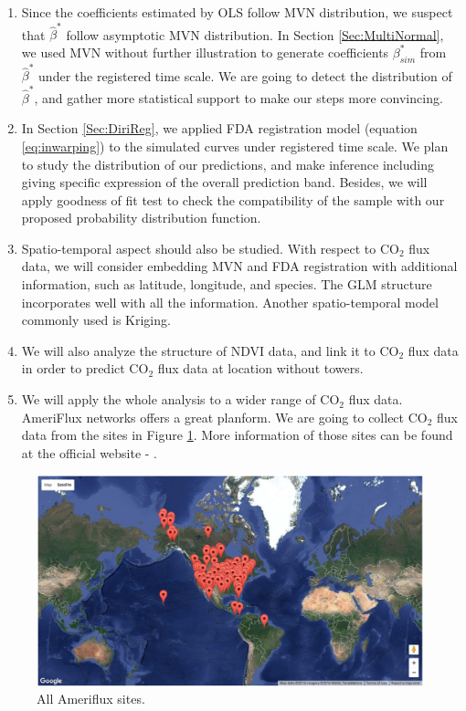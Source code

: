 \documentclass{article}
\newcommand{\MYhref}[3][blue]{\href{#2}{\color{#1}{#3}}}%
\begin{document}
\begin{enumerate}
\item Since the coefficients estimated by OLS follow MVN distribution, we suspect that $\widehat{\beta}^{*}$ follow asymptotic MVN distribution. In Section \ref{Sec:MultiNormal}, we used MVN without further illustration to generate coefficients $\beta^{*}_{sim}$  from $\widehat{\beta}^{*}$ under the registered time scale. We are going to detect the distribution of $\widehat{\beta}^{*}$, and gather more statistical support to make our steps more convincing. 
\item In Section \ref{Sec:DiriReg}, we applied FDA registration model (equation \ref{eq:inwarping}) to the simulated curves under registered time scale. We plan to study the distribution of our predictions, and make inference including giving specific expression of the overall prediction band. Besides, we will apply goodness of fit test to check the compatibility of the sample with our proposed probability distribution function.
\item Spatio-temporal aspect should also be studied. With respect to CO$_2$ flux data, we will consider embedding MVN and FDA registration with additional information, such as latitude, longitude, and species.  The GLM structure incorporates well with all the information. Another spatio-temporal model commonly used is Kriging.
\item We will also analyze the structure of NDVI data, and link it to CO$_2$ flux data in order to predict CO$_2$ flux data at location without towers.
\item We will apply the whole analysis to a wider range of CO$_2$ flux data.  AmeriFlux networks offers a great planform. We are going to collect CO$_2$ flux data from the sites in Figure \ref{Fig:AllSites}. More information of those sites can be found at the official website - \MYhref[brown]{http://ameriflux.lbl.gov/sites/site-list-and-pages/}{AmeriFlux Site List}.
\end{enumerate}

\begin{figure}[!ht]
\centering
\includegraphics[width=14cm]{AllSites.png}
\caption{All Ameriflux sites.}
\label{Fig:AllSites}
\end{figure}
\end{document}
